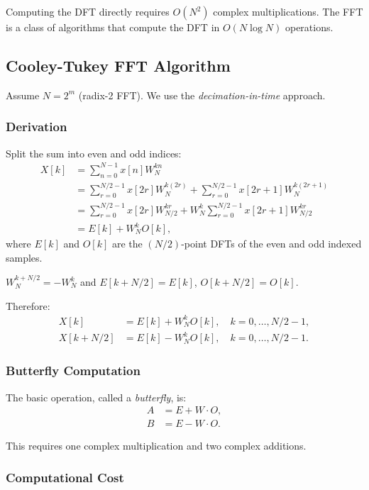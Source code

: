 \begin{notechapter}
Computing the DFT directly requires $O(N^2)$ complex multiplications. The FFT is a class of algorithms that compute the DFT in $O(N \log N)$ operations.

\subsection{Cooley-Tukey FFT Algorithm}

Assume $N = 2^m$ (radix-2 FFT). We use the \emph{decimation-in-time} approach.

\subsubsection{Derivation}

Split the sum into even and odd indices:
\begin{align*}
X[k] &= \sum_{n=0}^{N-1} x[n] W_N^{kn} \\
&= \sum_{r=0}^{N/2-1} x[2r] W_N^{k(2r)} + \sum_{r=0}^{N/2-1} x[2r+1] W_N^{k(2r+1)} \\
&= \sum_{r=0}^{N/2-1} x[2r] W_{N/2}^{kr} + W_N^k \sum_{r=0}^{N/2-1} x[2r+1] W_{N/2}^{kr} \\
&= E[k] + W_N^k O[k],
\end{align*}
where $E[k]$ and $O[k]$ are the $(N/2)$-point DFTs of the even and odd indexed samples.

\begin{lemma}
$W_N^{k+N/2} = -W_N^k$ and $E[k + N/2] = E[k]$, $O[k + N/2] = O[k]$.
\end{lemma}

Therefore:
\begin{align*}
X[k] &= E[k] + W_N^k O[k], \quad k = 0, \ldots, N/2-1, \\
X[k + N/2] &= E[k] - W_N^k O[k], \quad k = 0, \ldots, N/2-1.
\end{align*}

\subsubsection{Butterfly Computation}

The basic operation, called a \emph{butterfly}, is:
\begin{align*}
A &= E + W \cdot O, \\
B &= E - W \cdot O.
\end{align*}

This requires one complex multiplication and two complex additions.

\subsubsection{Computational Cost}


\end{notechapter}
